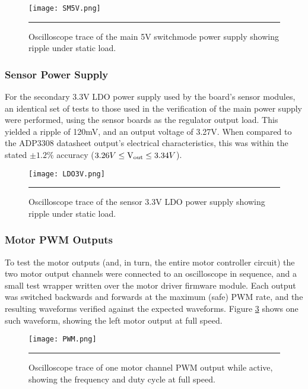 \begin{figure}[tbph]
	\vspace{1em}
	\centering
		\texttt{[image: SM5V.png]}
	\rule{35em}{0.5pt}
	\caption[Switch-mode 5V Power Supply Oscilloscope Trace]{Oscilloscope trace of the main 5V switchmode power supply showing ripple under static load.}
	\label{fig:mainpowerripple}
\end{figure}

\FloatBarrier
\subsubsection{Sensor Power Supply}

For the secondary 3.3V LDO power supply used by the board's sensor modules, an identical set of tests to those used in the verification of the main power supply were performed, using the sensor boards as the regulator output load. This yielded a ripple of 120mV, and an output voltage of 3.27V. When compared to the ADP3308 datasheet output's electrical characteristics, this was within the stated \(\pm1.2\%\) accuracy (\(3.26V\leq\text{V\ensuremath{_{\textrm{out}}}}\leq3.34V\)).

\begin{figure}[tbph]
	\vspace{1em}
	\centering
		\texttt{[image: LDO3V.png]}
	\rule{35em}{0.5pt}
	\caption[LDO 3.3V Power Supply Oscilloscope Trace]{Oscilloscope trace of the sensor 3.3V LDO power supply showing ripple under static load.}
	\label{fig:sensorpowerripple}
\end{figure}

\FloatBarrier
\subsubsection{Motor PWM Outputs}

To test the motor outputs (and, in turn, the entire motor controller circuit) the two motor output channels were connected to an oscilloscope in sequence, and a small test wrapper written over the motor driver firmware module. Each output was switched backwards and forwards at the maximum (safe) PWM rate, and the resulting waveforms verified against the expected waveforms. Figure \ref{fig:motorpwm} shows one such waveform, showing the left motor output at full speed.

\begin{figure}[tbph]
	\vspace{1em}
	\centering
		\texttt{[image: PWM.png]}
	\rule{35em}{0.5pt}
	\caption[Motor PWM Oscilloscope Trace]{Oscilloscope trace of one motor channel PWM output while active, showing the frequency and duty cycle at full speed.}
	\label{fig:motorpwm}
\end{figure}


